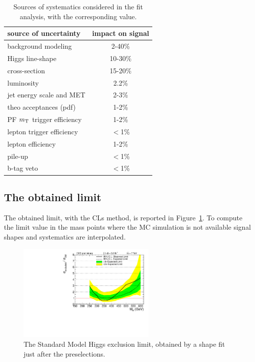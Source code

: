 \begin{table}[h!]
\begin{center}
\begin{tabular}{l|c}
\hline
source of uncertainty &  impact on signal  \\
\hline
\hline
background modeling                        &  2-40\% \\
Higgs line-shape                           & 10-30\% \\
cross-section                              & 15-20\% \\
luminosity                                 &   2.2\% \\
jet energy scale and MET                   &   2-3\% \\
theo acceptances (pdf)                     &   1-2\% \\
PF $m_{\textnormal{T}}$ trigger efficiency &   1-2\% \\
lepton trigger efficiency                  &  $<$1\% \\
lepton efficiency                          &   1-2\% \\
pile-up                                    &  $<$1\% \\
b-tag veto                                 &  $<$1\% \\
\hline
\end{tabular}
\end{center}
\caption{Sources of systematics considered in the fit analysis, with the corresponding value.}
\label{tab:fitSystematics}
\end{table}



\subsection{The obtained limit}

The obtained limit,
with the CLs method, is reported in Figure~\ref{fig:firstLimit}.
To compute the limit value in the mass points where the MC simulation is not available
signal shapes and systematics are interpolated.\\

\begin{figure}[htb]
\begin{center}
   \includegraphics[width=0.6\textwidth]{plots/limitplot/limit_first.pdf}
   \caption{The Standard Model Higgs exclusion limit, obtained by a shape fit just after the preselections.}
 \label{fig:firstLimit}
\end{center}
\end{figure}

